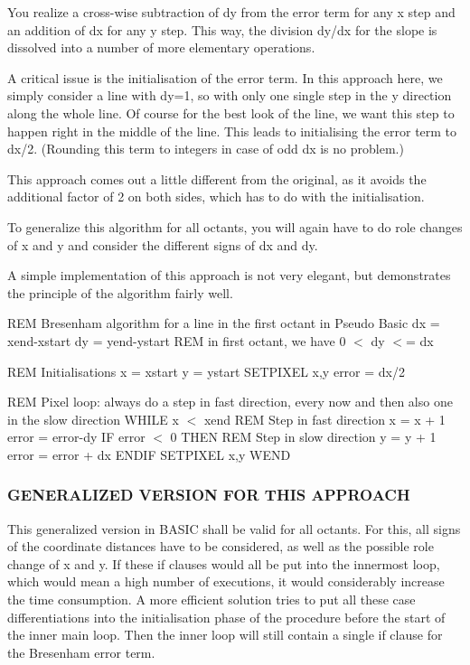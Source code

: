 You realize a cross-\/wise subtraction of dy from the error term for any x step and an addition of dx for any y step. This way, the division dy/dx for the slope is dissolved into a number of more elementary operations.

A critical issue is the initialisation of the error term. In this approach here, we simply consider a line with dy=1, so with only one single step in the y direction along the whole line. Of course for the best look of the line, we want this step to happen right in the middle of the line. This leads to initialising the error term to dx/2. (Rounding this term to integers in case of odd dx is no problem.)

This approach comes out a little different from the original, as it avoids the additional factor of 2 on both sides, which has to do with the initialisation.

To generalize this algorithm for all octants, you will again have to do role changes of x and y and consider the different signs of dx and dy.

A simple implementation of this approach is not very elegant, but demonstrates the principle of the algorithm fairly well.

R\+EM Bresenham algorithm for a line in the first octant in Pseudo Basic dx = xend-\/xstart dy = yend-\/ystart R\+EM in first octant, we have 0 $<$ dy $<$= dx

R\+EM Initialisations x = xstart y = ystart S\+E\+T\+P\+I\+X\+EL x,y error = dx/2

R\+EM Pixel loop\+: always do a step in fast direction, every now and then also one in the slow direction W\+H\+I\+LE x $<$ xend R\+EM Step in fast direction x = x + 1 error = error-\/dy IF error $<$ 0 T\+H\+EN R\+EM Step in slow direction y = y + 1 error = error + dx E\+N\+D\+IF S\+E\+T\+P\+I\+X\+EL x,y W\+E\+ND

\subsubsection*{G\+E\+N\+E\+R\+A\+L\+I\+Z\+ED V\+E\+R\+S\+I\+ON F\+OR T\+H\+IS A\+P\+P\+R\+O\+A\+CH}

This generalized version in B\+A\+S\+IC shall be valid for all octants. For this, all signs of the coordinate distances have to be considered, as well as the possible role change of x and y. If these if clauses would all be put into the innermost loop, which would mean a high number of executions, it would considerably increase the time consumption. A more efficient solution tries to put all these case differentiations into the initialisation phase of the procedure before the start of the inner main loop. Then the inner loop will still contain a single if clause for the Bresenham error term.

